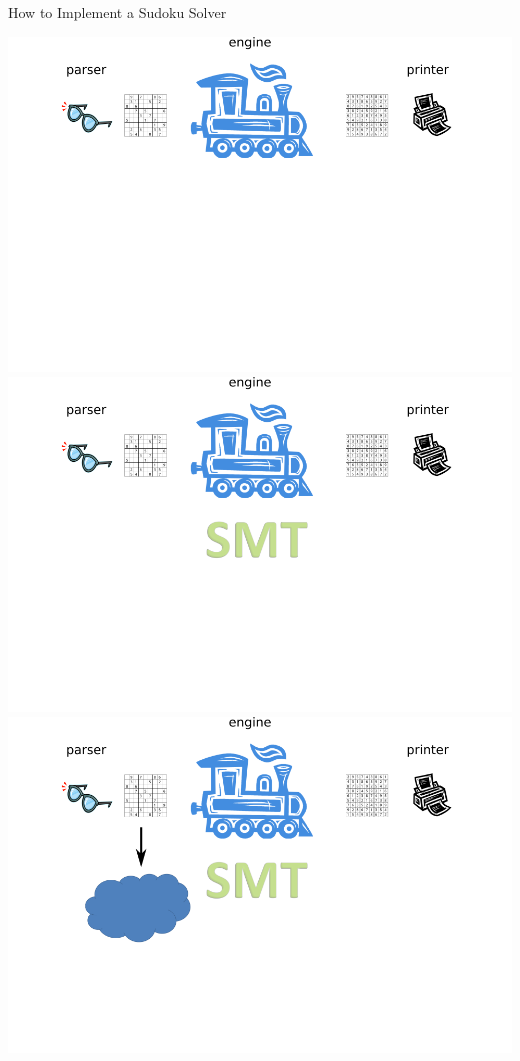 \documentclass{beamer}
\begin{document}
\begin{frame}{How to Implement a Sudoku Solver}
\begin{overprint}
 \includegraphics[width=\textwidth]{current1}
 \includegraphics[width=\textwidth]{current2}
 \includegraphics[width=\textwidth]{current3}

\end{overprint}
\end{frame}
\end{document}

